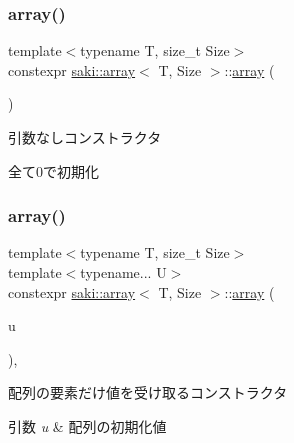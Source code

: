 \subsubsection{\texorpdfstring{array()}{array()}\hspace{0.1cm}{\footnotesize\ttfamily [1/4]}}
{\footnotesize\ttfamily template$<$typename T, size\+\_\+t Size$>$ \\
constexpr \mbox{\hyperlink{classsaki_1_1array}{saki\+::array}}$<$ T, Size $>$\+::\mbox{\hyperlink{classsaki_1_1array}{array}} (\begin{DoxyParamCaption}{ }\end{DoxyParamCaption})\hspace{0.3cm}{\ttfamily [inline]}}



引数なしコンストラクタ 

全て0で初期化 \mbox{\label{classsaki_1_1array_a6af2c7db82438d7d56ef7c9e3d1f0cf5}} 
\subsubsection{\texorpdfstring{array()}{array()}\hspace{0.1cm}{\footnotesize\ttfamily [2/4]}}
{\footnotesize\ttfamily template$<$typename T, size\+\_\+t Size$>$ \\
template$<$typename... U$>$ \\
constexpr \mbox{\hyperlink{classsaki_1_1array}{saki\+::array}}$<$ T, Size $>$\+::\mbox{\hyperlink{classsaki_1_1array}{array}} (\begin{DoxyParamCaption}\item[{const U \&...}]{u }\end{DoxyParamCaption})\hspace{0.3cm}{\ttfamily [inline]}, {\ttfamily [explicit]}}



配列の要素だけ値を受け取るコンストラクタ 


\begin{DoxyParams}{引数}
{\em u} & 配列の初期化値 \\
\hline
\end{DoxyParams}
\mbox{\label{classsaki_1_1array_a788262c2c0f097b6e8f1a9fbd6bf0034}} 
